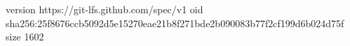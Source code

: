 version https://git-lfs.github.com/spec/v1
oid sha256:25f8676ccb5092d5e15270eae21b8f271bde2b090083b77f2cf199d6b024d75f
size 1602
